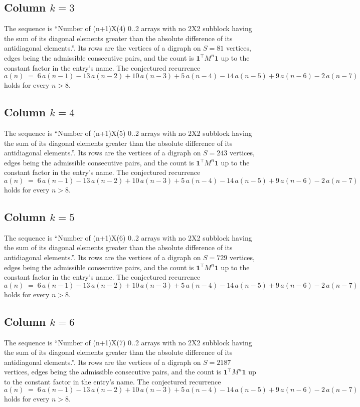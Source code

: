 \documentclass[11pt,a4paper]{article}
\theoremstyle{plain}
\theoremstyle{definition}
\begin{document}
\subsection*{Column $k=3$}
The sequence is ``Number of (n+1)X(4) 0..2 arrays with no 2X2 subblock having the sum of its diagonal elements greater than the absolute difference of its antidiagonal elements.''. Its rows are the vertices of a digraph on
$S=81$ vertices, edges being the admissible consecutive pairs, and the count is
$\mathbf{1}^{\!\top}M^{n}\mathbf{1}$ up to the constant factor in the entry's name.
The conjectured recurrence
\[
a(n)\;=\;6\,a(n-1) - 13\,a(n-2) + 10\,a(n-3) + 5\,a(n-4) - 14\,a(n-5) + 9\,a(n-6) - 2\,a(n-7)
\]
holds for every $n>8$.

\subsection*{Column $k=4$}
The sequence is ``Number of (n+1)X(5) 0..2 arrays with no 2X2 subblock having the sum of its diagonal elements greater than the absolute difference of its antidiagonal elements.''. Its rows are the vertices of a digraph on
$S=243$ vertices, edges being the admissible consecutive pairs, and the count is
$\mathbf{1}^{\!\top}M^{n}\mathbf{1}$ up to the constant factor in the entry's name.
The conjectured recurrence
\[
a(n)\;=\;6\,a(n-1) - 13\,a(n-2) + 10\,a(n-3) + 5\,a(n-4) - 14\,a(n-5) + 9\,a(n-6) - 2\,a(n-7)
\]
holds for every $n>8$.

\subsection*{Column $k=5$}
The sequence is ``Number of (n+1)X(6) 0..2 arrays with no 2X2 subblock having the sum of its diagonal elements greater than the absolute difference of its antidiagonal elements.''. Its rows are the vertices of a digraph on
$S=729$ vertices, edges being the admissible consecutive pairs, and the count is
$\mathbf{1}^{\!\top}M^{n}\mathbf{1}$ up to the constant factor in the entry's name.
The conjectured recurrence
\[
a(n)\;=\;6\,a(n-1) - 13\,a(n-2) + 10\,a(n-3) + 5\,a(n-4) - 14\,a(n-5) + 9\,a(n-6) - 2\,a(n-7)
\]
holds for every $n>8$.

\subsection*{Column $k=6$}
The sequence is ``Number of (n+1)X(7) 0..2 arrays with no 2X2 subblock having the sum of its diagonal elements greater than the absolute difference of its antidiagonal elements.''. Its rows are the vertices of a digraph on
$S=2187$ vertices, edges being the admissible consecutive pairs, and the count is
$\mathbf{1}^{\!\top}M^{n}\mathbf{1}$ up to the constant factor in the entry's name.
The conjectured recurrence
\[
a(n)\;=\;6\,a(n-1) - 13\,a(n-2) + 10\,a(n-3) + 5\,a(n-4) - 14\,a(n-5) + 9\,a(n-6) - 2\,a(n-7)
\]
holds for every $n>8$.
\end{document}
